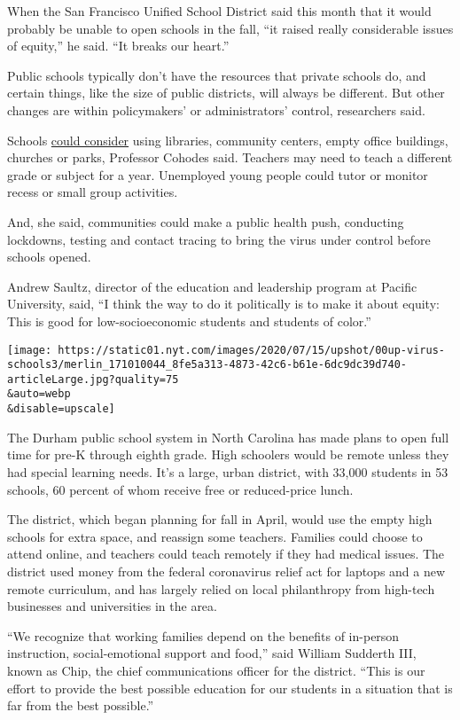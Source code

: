 When the San Francisco Unified School District said this month that it
would probably be unable to open schools in the fall, ``it raised really
considerable issues of equity,'' he said. ``It breaks our heart.''

Public schools typically don't have the resources that private schools
do, and certain things, like the size of public districts, will always
be different. But other changes are within policymakers' or
administrators' control, researchers said.

Schools
\href{https://www.theatlantic.com/ideas/archive/2020/07/better-fall-possible/613882/}{could
consider} using libraries, community centers, empty office buildings,
churches or parks, Professor Cohodes said. Teachers may need to teach a
different grade or subject for a year. Unemployed young people could
tutor or monitor recess or small group activities.

And, she said, communities could make a public health push, conducting
lockdowns, testing and contact tracing to bring the virus under control
before schools opened.

Andrew Saultz, director of the education and leadership program at
Pacific University, said, ``I think the way to do it politically is to
make it about equity: This is good for low-socioeconomic students and
students of color.''

\texttt{[image: https://static01.nyt.com/images/2020/07/15/upshot/00up-virus-schools3/merlin\_171010044\_8fe5a313-4873-42c6-b61e-6dc9dc39d740-articleLarge.jpg?quality=75\\\&auto=webp\\\&disable=upscale]}

The Durham public school system in North Carolina has made plans to open
full time for pre-K through eighth grade. High schoolers would be remote
unless they had special learning needs. It's a large, urban district,
with 33,000 students in 53 schools, 60 percent of whom receive free or
reduced-price lunch.

The district, which began planning for fall in April, would use the
empty high schools for extra space, and reassign some teachers. Families
could choose to attend online, and teachers could teach remotely if they
had medical issues. The district used money from the federal coronavirus
relief act for laptops and a new remote curriculum, and has largely
relied on local philanthropy from high-tech businesses and universities
in the area.

``We recognize that working families depend on the benefits of in-person
instruction, social-emotional support and food,'' said William Sudderth
III, known as Chip, the chief communications officer for the district.
``This is our effort to provide the best possible education for our
students in a situation that is far from the best possible.''

